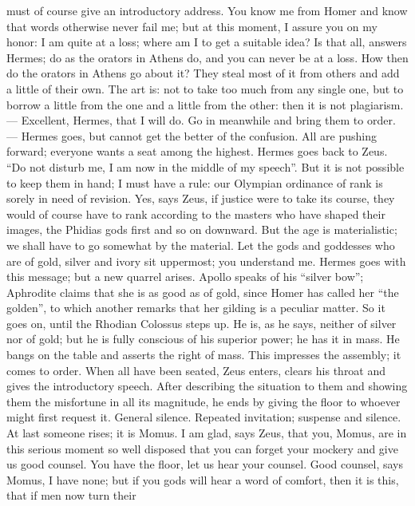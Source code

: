 \documentclass[12pt,a4paper,openany]{book}
\newcommand{\opage}[1]{\marginnote{\footnotesize\textit{[#1]}}}
\begin{document}
must of course give an introductory address. You know me from Homer and know that words
otherwise never fail me; but at this moment, I assure you on my honor: I am quite at a loss;
where am I to get a suitable idea? Is that all, answers Hermes; do as the orators in Athens do,
and you can never be at a loss. How then do the orators in Athens go about it? They steal most
of it from others and add a little of
\setcounter{footnote}{0}%
\opage{46}their own. The art is: not to take too much from any single one, but to borrow a little
from the one and a little from the other: then it is not plagiarism. --- Excellent, Hermes,
that I will do. Go in meanwhile and bring them to order. --- Hermes goes, but cannot get the
better of the confusion. All are pushing forward; everyone wants a seat among the highest.
Hermes goes back to Zeus. ``Do not disturb me, I am now in the middle of my speech''. But it is
not possible to keep them in hand; I must have a rule: our Olympian ordinance of rank is sorely
in need of revision. Yes, says Zeus, if justice were to take its course, they would of course
have to rank according to the masters who have shaped their images, the Phidias gods first and
so on downward. But the age is materialistic; we shall have to go somewhat by the material. Let
the gods and goddesses who are of gold, silver and ivory sit uppermost; you understand me.
Hermes goes with this message; but a new quarrel arises. Apollo speaks of his ``silver bow'';
Aphrodite claims that she is as good as of gold, since Homer has called her ``the golden'', to
which another remarks that her gilding is a peculiar matter. So it goes on, until the Rhodian
Colossus steps up. He is, as he says, neither of silver nor of gold; but he is fully conscious
of his superior power; he has it in mass. He bangs on the table and asserts the right of mass.
This impresses the assembly; it comes to order. When all have been seated, Zeus enters, clears
his throat and gives the introductory speech. After describing the situation to them and
showing them the misfortune in all its magnitude, he ends by giving the floor to whoever might
first request it. General silence. Repeated invitation;
\setcounter{footnote}{0}%
\opage{47}suspense and silence. At last someone rises; it is Momus. I am glad, says Zeus, that you,
Momus, are in this serious moment so well disposed that you can forget your mockery and give us
good counsel. You have the floor, let us hear your counsel. Good counsel, says Momus, I have
none; but if you gods will hear a word of comfort, then it is this, that if men now turn their
\end{document}
